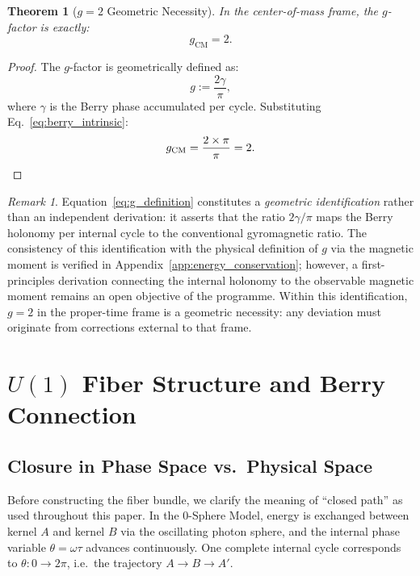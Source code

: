 \documentclass[%
 reprint,
 amsmath,amssymb,
 aps,
 prb,
]{revtex4-2}
\numberwithin{equation}{section}
\newtheorem{theorem}{Theorem}[section]
\theoremstyle{definition}
\theoremstyle{remark}
\newtheorem{remark}{Remark}[section]
\newcommand{\Uone}{U(1)}
\begin{document}
\begin{theorem}[$g=2$ Geometric Necessity]
\label{thm:g_equals_2}
In the center-of-mass frame, the $g$-factor is exactly:
\begin{equation}
g_{\text{CM}} = 2.
\label{eq:g_CM}
\end{equation}
\end{theorem}

\begin{proof}
The $g$-factor is geometrically defined as:
\begin{equation}
g := \frac{2\gamma}{\pi},
\label{eq:g_definition}
\end{equation}
where $\gamma$ is the Berry phase accumulated per cycle. Substituting Eq.~\eqref{eq:berry_intrinsic}:
\begin{equation}
g_{\text{CM}} = \frac{2 \times \pi}{\pi} = 2. \qedhere
\end{equation}
\end{proof}

\begin{remark}
Equation~\eqref{eq:g_definition} constitutes a \emph{geometric identification}
rather than an independent derivation: it asserts that the ratio $2\gamma/\pi$
maps the Berry holonomy per internal cycle to the conventional gyromagnetic ratio.
The consistency of this identification with the physical definition of $g$ via the
magnetic moment is verified in Appendix~\ref{app:energy_conservation}; however,
a first-principles derivation connecting the internal holonomy to the observable
magnetic moment remains an open objective of the programme.
Within this identification, $g = 2$ in the proper-time frame is a geometric
necessity: any deviation must originate from corrections external to that frame.
\end{remark}


\section{$\Uone$ Fiber Structure and Berry Connection}
\label{sec:u1fiber}

\subsection{Closure in Phase Space vs.\ Physical Space}
\label{sec:closure_remark}

Before constructing the fiber bundle, we clarify the meaning of ``closed path'' as used throughout this paper. In the 0-Sphere Model, energy is exchanged between kernel $A$ and kernel $B$ via the oscillating photon sphere, and the internal phase variable $\theta = \omega\tau$ advances continuously. One complete internal cycle corresponds to $\theta: 0 \to 2\pi$, i.e.\ the trajectory $A \to B \to A'$.
\end{document}
